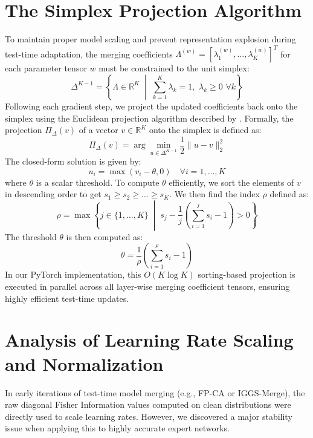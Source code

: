 \documentclass{article}
\theoremstyle{plain}
\theoremstyle{definition}
\theoremstyle{remark}
\begin{document}
\section{The Simplex Projection Algorithm}
\label{appendix:simplex_projection}
To maintain proper model scaling and prevent representation explosion during test-time adaptation, the merging coefficients $\Lambda^{(w)} = [\lambda_1^{(w)}, \dots, \lambda_K^{(w)}]^T$ for each parameter tensor $w$ must be constrained to the unit simplex:
\begin{equation}
\Delta^{K-1} = \left\{ \Lambda \in \mathbb{R}^K \;\middle|\; \sum_{k=1}^K \lambda_k = 1, \,\, \lambda_k \geq 0 \,\, \forall k \right\}
\end{equation}
Following each gradient step, we project the updated coefficients back onto the simplex using the Euclidean projection algorithm described by \citet{duchi2008efficient}. Formally, the projection $\Pi_{\Delta}(v)$ of a vector $v \in \mathbb{R}^K$ onto the simplex is defined as:
\begin{equation}
\Pi_{\Delta}(v) = \arg\min_{u \in \Delta^{K-1}} \frac{1}{2} \|u - v\|^2_2
\end{equation}
The closed-form solution is given by:
\begin{equation}
u_i = \max(v_i - \theta, 0) \quad \forall i = 1, \dots, K
\end{equation}
where $\theta$ is a scalar threshold. To compute $\theta$ efficiently, we sort the elements of $v$ in descending order to get $s_1 \geq s_2 \geq \dots \geq s_K$. We then find the index $\rho$ defined as:
\begin{equation}
\rho = \max \left\{ j \in \{1, \dots, K\} \;\middle|\; s_j - \frac{1}{j} \left( \sum_{i=1}^j s_i - 1 \right) > 0 \right\}
\end{equation}
The threshold $\theta$ is then computed as:
\begin{equation}
\theta = \frac{1}{\rho} \left( \sum_{i=1}^{\rho} s_i - 1 \right)
\end{equation}
In our PyTorch implementation, this $O(K \log K)$ sorting-based projection is executed in parallel across all layer-wise merging coefficient tensors, ensuring highly efficient test-time updates.

\section{Analysis of Learning Rate Scaling and Normalization}
\label{appendix:lr_scaling}
In early iterations of test-time model merging (e.g., FP-CA or IGGS-Merge), the raw diagonal Fisher Information values computed on clean distributions were directly used to scale learning rates. However, we discovered a major stability issue when applying this to highly accurate expert networks. 
\end{document}
